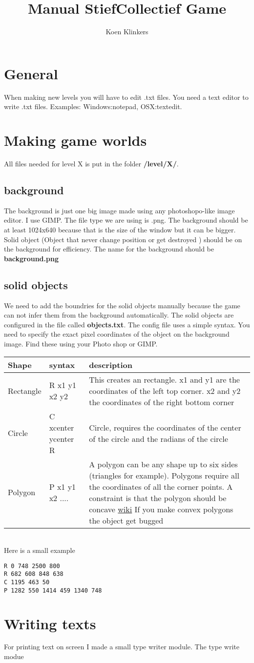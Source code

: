 \documentclass[5pt]{article}
\title{\textbf{Manual StiefCollectief Game}}
\author{Koen Klinkers}
\begin{document}
\maketitle
\section{General}
When making new levels you will have to edit .txt files. You need a text editor to write .txt files. Examples: Windows:notepad, OSX:textedit.  

\section{Making game worlds}
All files needed for level X is put in the folder \textbf{/level/X/}.
\subsection{background}
The background is just one big image made using any photoshopo-like image editor. I use GIMP. The file type we are using is .png. The background should be at least 1024x640 because that is the size of the window but it can be bigger. Solid object (Object that never change position or get destroyed ) should be on the background for efficiency. The name for the background should be \textbf{background.png}
\subsection{solid objects}
We need to add the boundries for the solid objects manually because the game can not infer them from the background automatically. The solid objects are configured in the file called \textbf{objects.txt}. The config file uses a simple syntax. You need to specify the exact pixel coordinates of the object on the background image. Find these using your Photo shop or GIMP.

\begin{tabular}{|l|l|p{5cm}|}
	\hline
	Shape & syntax & description\\
	\hline
	Rectangle & R x1 y1 x2 y2 & This creates an rectangle. x1 and y1 are the coordinates of the left top corner. x2 and y2 the coordinates of the right bottom corner\\
	\hline
	Circle & C xcenter ycenter R & Circle, requires the coordinates of the center of the circle and the radians of the circle\\
	\hline
	Polygon & P x1 y1 x2 .... & A polygon can be any shape up to six sides (triangles for example). Polygons require all the coordinates of all the corner points. A constraint is that the polygon should be concave \href{http://en.wikipedia.org/wiki/Convex_polygon}{wiki} If you make convex polygons the object get bugged\\
	\hline
\end{tabular}
\\
Here is a small example
\begin{verbatim}
R 0 748 2500 800
R 682 608 848 638
C 1195 463 50
P 1282 550 1414 459 1340 748
\end{verbatim}



\section{Writing texts}
For printing text on screen I made a small type writer module. The type write modue 
\end{document}
